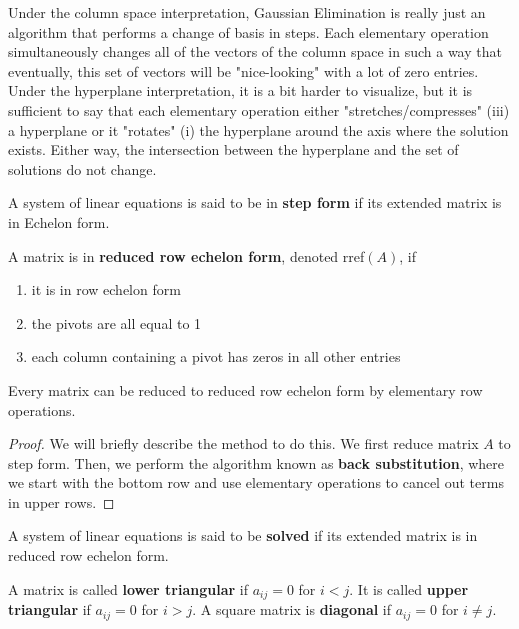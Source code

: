   Under the column space interpretation, Gaussian Elimination is really just an algorithm that performs a change of basis in steps. Each elementary operation simultaneously changes all of the vectors of the column space in such a way that eventually, this set of vectors will be "nice-looking" with a lot of zero entries. Under the hyperplane interpretation, it is a bit harder to visualize, but it is sufficient to say that each elementary operation either "stretches/compresses" (iii) a hyperplane or it "rotates" (i) the hyperplane around the axis where the solution exists. Either way, the intersection between the hyperplane and the set of solutions do not change. 

  \begin{definition}
    A system of linear equations is said to be in \textbf{step form} if its extended matrix is in Echelon form. 
  \end{definition}

  \begin{definition}
    A matrix is in \textbf{reduced row echelon form}, denoted rref$(A)$, if
    \begin{enumerate}
      \item it is in row echelon form
      \item the pivots are all equal to 1
      \item each column containing a pivot has zeros in all other entries
    \end{enumerate}
  \end{definition}

  \begin{theorem}
    Every matrix can be reduced to reduced row echelon form by elementary row operations. 
  \end{theorem}
  \begin{proof}
    We will briefly describe the method to do this. We first reduce matrix $A$ to step form. Then, we perform the algorithm known as \textbf{back substitution}, where we start with the bottom row and use elementary operations to cancel out terms in upper rows. 
  \end{proof}

  \begin{definition}
    A system of linear equations is said to be \textbf{solved} if its extended matrix is in reduced row echelon form. 
  \end{definition}

  \begin{definition}
    A matrix is called \textbf{lower triangular} if $a_{i j} = 0$ for $i < j$. It is called \textbf{upper triangular} if $a_{i j} = 0$ for $i > j$. A square matrix is \textbf{diagonal} if $a_{i j} = 0$ for $i \neq j$. 
  \end{definition}

